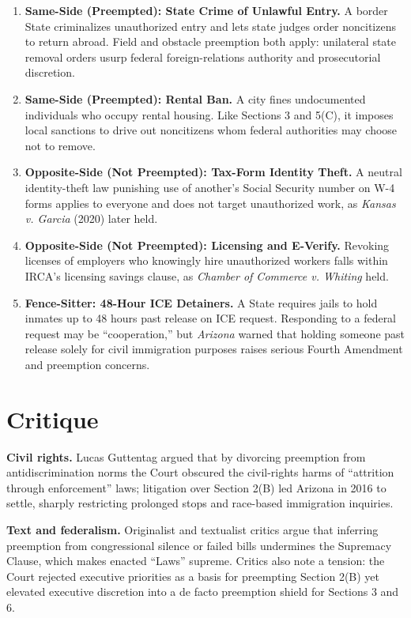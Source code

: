 \documentclass[12pt]{article}
\begin{document}
\begin{enumerate}
\item \textbf{Same-Side (Preempted): State Crime of Unlawful Entry.} A border State criminalizes unauthorized entry and lets state judges order noncitizens to return abroad. Field and obstacle preemption both apply: unilateral state removal orders usurp federal foreign-relations authority and prosecutorial discretion.
\item \textbf{Same-Side (Preempted): Rental Ban.} A city fines undocumented individuals who occupy rental housing. Like Sections 3 and 5(C), it imposes local sanctions to drive out noncitizens whom federal authorities may choose not to remove.
\item \textbf{Opposite-Side (Not Preempted): Tax-Form Identity Theft.} A neutral identity-theft law punishing use of another's Social Security number on W-4 forms applies to everyone and does not target unauthorized work, as \textit{Kansas v. Garcia} (2020) later held.
\item \textbf{Opposite-Side (Not Preempted): Licensing and E-Verify.} Revoking licenses of employers who knowingly hire unauthorized workers falls within IRCA's licensing savings clause, as \textit{Chamber of Commerce v. Whiting} held.
\item \textbf{Fence-Sitter: 48-Hour ICE Detainers.} A State requires jails to hold inmates up to 48 hours past release on ICE request. Responding to a federal request may be ``cooperation,'' but \textit{Arizona} warned that holding someone past release solely for civil immigration purposes raises serious Fourth Amendment and preemption concerns.
\end{enumerate}

\section{Critique}

\textbf{Civil rights.} Lucas Guttentag argued that by divorcing preemption from antidiscrimination norms the Court obscured the civil-rights harms of ``attrition through enforcement'' laws; litigation over Section 2(B) led Arizona in 2016 to settle, sharply restricting prolonged stops and race-based immigration inquiries.

\textbf{Text and federalism.} Originalist and textualist critics argue that inferring preemption from congressional silence or failed bills undermines the Supremacy Clause, which makes enacted ``Laws'' supreme. Critics also note a tension: the Court rejected executive priorities as a basis for preempting Section 2(B) yet elevated executive discretion into a de facto preemption shield for Sections 3 and 6.
\end{document}
